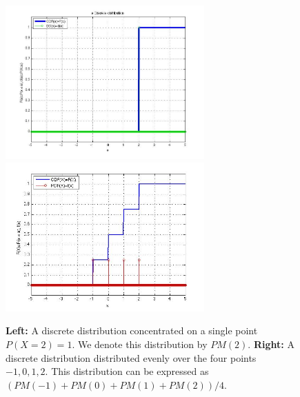 \documentclass{report}
\theoremstyle{plain}
\theoremstyle{definition}
\begin{document}
\begin{figure}[t]
\begin{center}
\includegraphics[width=3in]{figs/Discrete1.jpg}
\includegraphics[width=3in]{figs/4PointMass.jpg}
\end{center}
\caption{{\bf Left:} A discrete distribution concentrated on a single
  point $P(X=2)=1$. We denote this distribution by $PM(2)$.  {\bf
    Right:} A discrete distribution distributed evenly over the four
  points $-1,0,1,2$. This distribution can be expressed as $(PM(-1)+PM(0)+PM(1)+PM(2))/4$.}
\end{figure}
\end{document}

